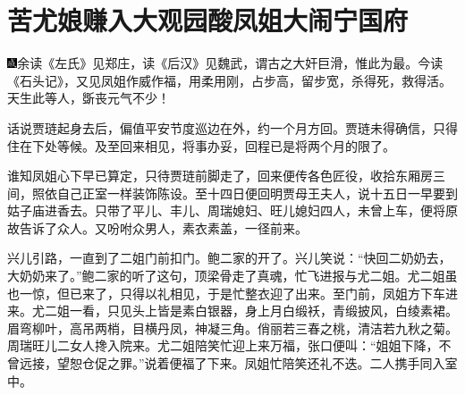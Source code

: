 
\chapter{苦尤娘赚入大观园\hspace{.5em}酸凤姐大闹宁国府}

{\includegraphics[width=3mm]{../Images/00005}\kaishu 余读《左氏》见郑庄，读《后汉》见魏武，谓古之大奸巨滑，惟此为最。今读《石头记》，又见凤姐作威作福，用柔用刚，占步高，留步宽，杀得死，救得活。天生此等人，斲丧元气不少！}

话说贾琏起身去后，偏值平安节度巡边在外，约一个月方回。贾琏未得确信，只得住在下处等候。及至回来相见，将事办妥，回程已是将两个月的限了。

谁知凤姐心下早已算定，只待贾琏前脚走了，回来便传各色匠役，收拾东厢房三间，照依自己正室一样装饰陈设。至十四日便回明贾母王夫人，说十五日一早要到姑子庙进香去。只带了平儿、丰儿、周瑞媳妇、旺儿媳妇四人，未曾上车，便将原故告诉了众人。又吩咐众男人，素衣素盖，一径前来。

兴儿引路，一直到了二姐门前扣门。鲍二家的开了。兴儿笑说：``快回二奶奶去，大奶奶来了。''鲍二家的听了这句，顶梁骨走了真魂，忙飞进报与尤二姐。尤二姐虽也一惊，但已来了，只得以礼相见，于是忙整衣迎了出来。至门前，凤姐方下车进来。尤二姐一看，只见头上皆是素白银器，身上月白缎袄，青缎披风，白绫素裙。眉弯柳叶，高吊两梢，目横丹凤，神凝三角。俏丽若三春之桃，清洁若九秋之菊。周瑞旺儿二女人搀入院来。尤二姐陪笑忙迎上来万福，张口便叫：``姐姐下降，不曾远接，望恕仓促之罪。''说着便福了下来。凤姐忙陪笑还礼不迭。二人携手同入室中。

